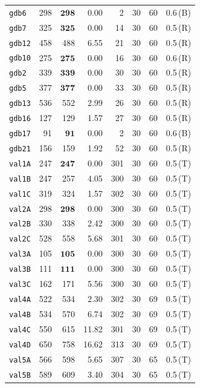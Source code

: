 \begin{longtable}{lrrrrrrl}
\texttt{gdb6} & 298 & $\mathbf{298}$ & 0.00 & 2 & 30 & 60 & 0.6\,(B) \\
\texttt{gdb7} & 325 & $\mathbf{325}$ & 0.00 & 14 & 30 & 60 & 0.5\,(R) \\
\texttt{gdb12} & 458 & 488 & 6.55 & 21 & 30 & 60 & 0.5\,(R) \\
\texttt{gdb10} & 275 & $\mathbf{275}$ & 0.00 & 16 & 30 & 60 & 0.6\,(R) \\
\texttt{gdb2} & 339 & $\mathbf{339}$ & 0.00 & 30 & 30 & 60 & 0.5\,(R) \\
\texttt{gdb5} & 377 & $\mathbf{377}$ & 0.00 & 33 & 30 & 60 & 0.5\,(R) \\
\texttt{gdb13} & 536 & 552 & 2.99 & 26 & 30 & 60 & 0.5\,(R) \\
\texttt{gdb16} & 127 & 129 & 1.57 & 27 & 30 & 60 & 0.5\,(R) \\
\texttt{gdb17} & 91 & $\mathbf{91}$ & 0.00 & 2 & 30 & 60 & 0.6\,(B) \\
\texttt{gdb21} & 156 & 159 & 1.92 & 52 & 30 & 60 & 0.5\,(R) \\
\texttt{val1A} & 247 & $\mathbf{247}$ & 0.00 & 301 & 30 & 60 & 0.5\,(T) \\
\texttt{val1B} & 247 & 257 & 4.05 & 300 & 30 & 60 & 0.5\,(T) \\
\texttt{val1C} & 319 & 324 & 1.57 & 302 & 30 & 60 & 0.5\,(T) \\
\texttt{val2A} & 298 & $\mathbf{298}$ & 0.00 & 300 & 30 & 60 & 0.5\,(T) \\
\texttt{val2B} & 330 & 338 & 2.42 & 300 & 30 & 60 & 0.5\,(T) \\
\texttt{val2C} & 528 & 558 & 5.68 & 301 & 30 & 60 & 0.5\,(T) \\
\texttt{val3A} & 105 & $\mathbf{105}$ & 0.00 & 300 & 30 & 60 & 0.5\,(T) \\
\texttt{val3B} & 111 & $\mathbf{111}$ & 0.00 & 300 & 30 & 60 & 0.5\,(T) \\
\texttt{val3C} & 162 & 171 & 5.56 & 300 & 30 & 60 & 0.5\,(T) \\
\texttt{val4A} & 522 & 534 & 2.30 & 302 & 30 & 69 & 0.5\,(T) \\
\texttt{val4B} & 534 & 570 & 6.74 & 302 & 30 & 69 & 0.5\,(T) \\
\texttt{val4C} & 550 & 615 & 11.82 & 301 & 30 & 69 & 0.5\,(T) \\
\texttt{val4D} & 650 & 758 & 16.62 & 313 & 30 & 69 & 0.5\,(T) \\
\texttt{val5A} & 566 & 598 & 5.65 & 307 & 30 & 65 & 0.5\,(T) \\
\texttt{val5B} & 589 & 609 & 3.40 & 304 & 30 & 65 & 0.5\,(T) \\

\end{longtable}

